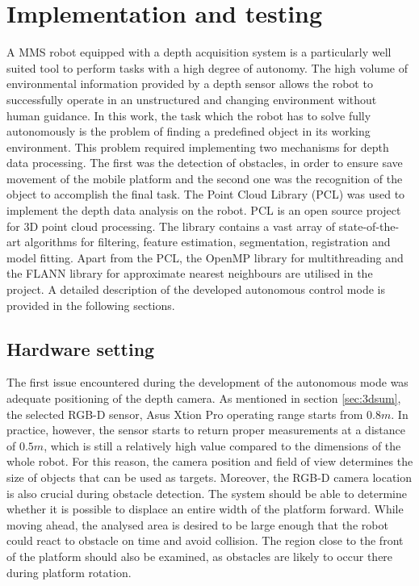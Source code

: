 \chapter{Implementation and testing}
\label{cha:implandtest}

A MMS robot equipped with a depth acquisition system is a particularly well suited tool to perform tasks with a high degree of autonomy. The high volume of environmental information provided by a depth sensor allows the robot to successfully operate in an unstructured and changing environment without human guidance. In this work, the task which the robot has to solve fully autonomously is the problem of finding a predefined object in its working environment. This problem required implementing two mechanisms for depth data processing. The first was the detection of obstacles, in order to ensure save movement of the mobile platform and the second one was the recognition of the object to accomplish the final task. The Point Cloud Library (PCL) \cite{Rusu_ICRA2011_PCL, pcl} was used to implement the depth data analysis on the robot. PCL is an open source project for 3D point cloud processing. The library contains a vast array of state-of-the-art algorithms for filtering, feature estimation, segmentation, registration and model fitting. Apart from the PCL, the OpenMP \cite{openmp} library for multithreading and the FLANN \cite{flann} library for approximate nearest neighbours are utilised in the project. A detailed description of the developed autonomous control mode is provided in the following sections.


\section{Hardware setting}
\label{sec:setting}

The first issue encountered during the development of the autonomous mode was adequate positioning of the depth camera. As mentioned in section \ref{sec:3dsum}, the selected RGB-D sensor, Asus Xtion Pro operating range starts from $0.8m$. In practice, however, the sensor starts to return proper measurements at a distance of $0.5m$, which is still a relatively high value compared to the dimensions of the whole robot. For this reason, the camera position and field of view determines the size of objects that can be used as targets. Moreover, the RGB-D camera location is also crucial during obstacle detection. The system should be able to determine whether it is possible to displace an entire width of the platform forward. While moving ahead, the analysed area is desired to be large enough that the robot could react to obstacle on time and avoid collision. The region close to the front of the platform should also be examined, as obstacles are likely to occur there during platform rotation.

